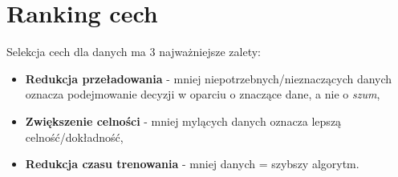 \section{Ranking cech}
	Selekcja cech dla danych ma 3 najważniejsze zalety:
	
	\begin{itemize}
		\item \textbf{Redukcja przeładowania} - mniej niepotrzebnych/nieznaczących danych oznacza podejmowanie decyzji w oparciu o znaczące dane, a nie o \textit{szum},
		\item \textbf{Zwiększenie celności} - mniej mylących danych oznacza lepszą celność/dokładność,
		\item \textbf{Redukcja czasu trenowania} - mniej danych = szybszy algorytm.
	\end{itemize}
	
	